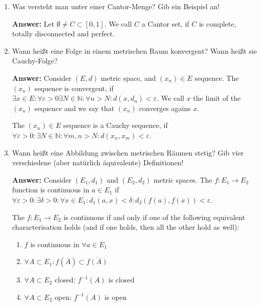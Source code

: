 \documentclass[11pt]{article}
\newcommand{\NN}[0]{\mathbb{N}}
\begin{document}
\begin{enumerate}
    \item Was versteht man unter einer Cantor-Menge? Gib ein Beispiel an!

    \textbf{Answer:} Let $\emptyset \neq C \subset [0, 1]$. We call $C$ a Cantor set, if $C$ is complete, totally disconnected and perfect.

    \item Wann heißt eine Folge in einem metrischen Raum konvergent? Wann heißt sie Cauchy-Folge?

    \textbf{Answer:} Consider $(E, d)$ metric space, and $(x_n) \in E$ sequence. The $(x_n)$ sequence is convergent, if $\exists x\in E\colon \forall \varepsilon > 0\exists N \in \NN\colon \forall n > N\colon d(x, d_n) < \varepsilon$. We call $x$ the limit of the $(x_n)$ sequence and we say that $(x_n)$ converges agains $x$.

    The $(x_n) \in E$ sequence is a Cauchy sequence, if $\forall \varepsilon > 0\colon \exists N \in \NN\colon \forall m, n > N\colon d(x_n, x_m) < \varepsilon$.

    \item Wann heißt eine Abbildung zwischen metrischen Räumen stetig? Gib vier verschiedene (aber natürlich äquivalente) Definitionen!

    \textbf{Answer:} Consider $(E_1, d_1)$ and $(E_2, d_2)$ metric spaces. The $f\colon E_1 \to E_2$ function is continuous in $a \in E_1$ if $\forall \varepsilon > 0\colon \exists \delta > 0\colon \forall x \in E_1\colon d_1(a, x) < \delta\colon d_2(f(a), f(x)) < \varepsilon$.

    The $f\colon E_1 \to E_2$ is continuous if and only if one of the following equivalent characterisation holds (and if one holds, then all the other hold as well):
    \begin{enumerate}
        \item $f$ is continuous in $\forall a \in E_1$
        \item $\forall A \subset E_1\colon f(\overline{A}) \subset \overline{f(A)}$
        \item $\forall A \subset E_2$ closed: $f^{-1}(A)$ is closed
        \item $\forall A \subset E_2$ open: $f^{-1}(A)$ is open
    \end{enumerate}


\end{enumerate}
\end{document}
